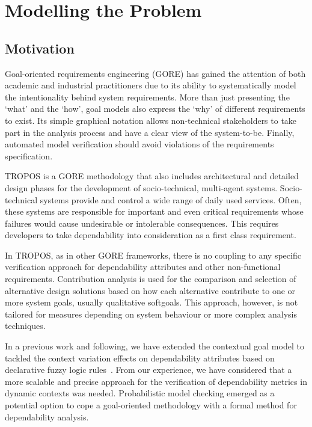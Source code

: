 \chapter{Modelling the Problem}\label{ch:motivation}

\section{Motivation}


Goal-oriented requirements engineering (GORE) has gained the attention of both academic and industrial practitioners due to its ability to systematically model the intentionality behind system requirements. More than just presenting the `what' and the `how', goal models also express the `why' of different requirements to exist. Its simple graphical notation allows non-technical stakeholders to take part in the analysis process and have a clear view of the system-to-be. Finally, automated model verification should avoid violations of the requirements specification.

TROPOS is a GORE methodology that also includes architectural and  detailed design phases for the development of socio-technical, multi-agent systems. Socio-technical systems provide and control a wide range of daily used services. Often, these systems are responsible for important and even critical requirements whose failures would cause undesirable or intolerable consequences. This requires developers to take dependability into consideration as a first class requirement.

In TROPOS, as in other GORE frameworks, there is no coupling to any specific verification approach for dependability attributes and other non-functional requirements. Contribution analysis is used for the comparison and selection of alternative design solutions based on how each alternative contribute to one or more system goals, usually qualitative softgoals. This approach, however, is not tailored for measures depending on system behaviour or more complex analysis techniques.

In a previous work and following, we have extended the contextual goal model to tackled the context variation effects on dependability attributes based on declarative fuzzy logic rules~\cite{Mendonca:2014}. From our experience, we have considered that a more scalable and precise approach for the verification of dependability metrics in dynamic contexts was needed. Probabilistic model checking emerged as a potential option to cope a goal-oriented methodology with a formal method for dependability analysis.

